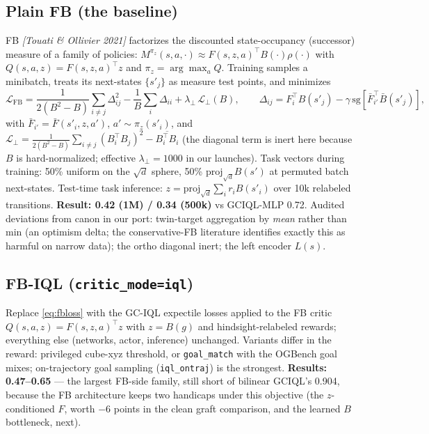 \documentclass[11pt]{article}
\newcommand{\sg}{\mathrm{sg}}
\begin{document}
\subsection{Plain FB (the baseline)}\label{sec:plainfb}
FB \emph{[Touati \& Ollivier 2021]} factorizes the discounted state-occupancy (successor)
measure of a family of policies: $M^{\pi_z}(s,a,\cdot)\approx F(s,z,a)^\top B(\cdot)\rho(\cdot)$
with $Q(s,a,z)=F(s,z,a)^\top z$ and $\pi_z=\arg\max_a Q$. Training samples a minibatch,
treats its next-states $\{s'_j\}$ as measure test points, and minimizes
\begin{equation}
\mathcal L_{\mathrm{FB}}
= \frac{1}{2(B^2{-}B)}\sum_{i\neq j}\Delta_{ij}^2 - \frac1B\sum_i \Delta_{ii}
+ \lambda_\perp\,\mathcal L_\perp(B),\qquad
\Delta_{ij}=F_i^\top B(s'_j)-\gamma\,\sg[\bar F_{i'}^\top\bar B(s'_j)],
\label{eq:fbloss}
\end{equation}
with $\bar F_{i'}=\bar F(s'_i,z,a')$, $a'\sim\pi_z(s'_i)$, and
$\mathcal L_\perp = \frac{1}{2(B^2-B)}\sum_{i\ne j}(B_i^\top B_j)^2-\overline{B_i^\top B_i}$
(the diagonal term is inert here because $B$ is hard-normalized; effective
$\lambda_\perp{=}1000$ in our launches). Task vectors during training: 50\% uniform on the
$\sqrt d$ sphere, 50\% $\mathrm{proj}_{\sqrt d}B(s')$ at permuted batch next-states.
Test-time task inference: $z=\mathrm{proj}_{\sqrt d}\sum_i r_i B(s'_i)$ over 10k relabeled
transitions. \textbf{Result: 0.42 (1M) / 0.34 (500k)} vs GCIQL-MLP 0.72.
Audited deviations from canon in our port: twin-target aggregation by \emph{mean} rather than
min (an optimism delta; the conservative-FB literature identifies exactly this as harmful on
narrow data); the ortho diagonal inert; the left encoder $L(s)$.

\subsection{FB-IQL (\texttt{critic\_mode=iql})}
Replace \eqref{eq:fbloss} with the GC-IQL expectile losses applied to the FB critic
$Q(s,a,z)=F(s,z,a)^\top z$ with $z=B(g)$ and hindsight-relabeled rewards; everything else
(networks, actor, inference) unchanged. Variants differ in the reward: privileged cube-xyz
threshold, or \texttt{goal\_match} with the OGBench goal mixes; on-trajectory goal sampling
(\texttt{iql\_ontraj}) is the strongest. \textbf{Results: 0.47--0.65} --- the largest
FB-side family, still short of bilinear GCIQL's 0.904, because the FB architecture keeps two
handicaps under this objective (the $z$-conditioned $F$, worth $-6$ points in the clean graft
comparison, and the learned $B$ bottleneck, next).
\end{document}

